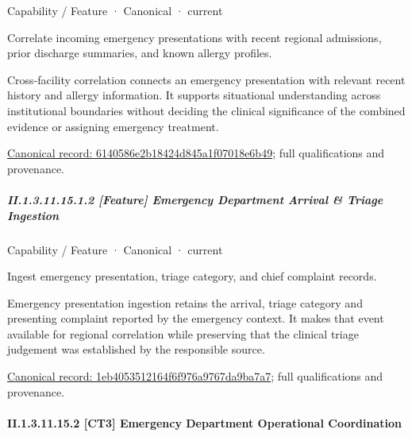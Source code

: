 \label{element:6140586e2b18424d845a1f07018e6b49}
{\small Capability / Feature · Canonical · current}\par

Correlate incoming emergency presentations with recent regional admissions, prior discharge summaries, and known allergy profiles.



Cross-facility correlation connects an emergency presentation with relevant recent history and allergy information. It supports situational understanding across institutional boundaries without deciding the clinical significance of the combined evidence or assigning emergency treatment.


{\footnotesize \href{../../../../continuum/strategy/capability/feature/6140586e2b18424d845a1f07018e6b49.md}{Canonical record: 6140586e2b18424d845a1f07018e6b49}; full qualifications and provenance.}\par
\subparagraph*{II.1.3.11.15.1.2 [Feature] Emergency Department Arrival \& Triage Ingestion}
\label{navigation:II.1.3.11.15.1.2}

\label{element:1eb4053512164f6f976a9767da9ba7a7}
{\small Capability / Feature · Canonical · current}\par

Ingest emergency presentation, triage category, and chief complaint records.



Emergency presentation ingestion retains the arrival, triage category and presenting complaint reported by the emergency context. It makes that event available for regional correlation while preserving that the clinical triage judgement was established by the responsible source.


{\footnotesize \href{../../../../continuum/strategy/capability/feature/1eb4053512164f6f976a9767da9ba7a7.md}{Canonical record: 1eb4053512164f6f976a9767da9ba7a7}; full qualifications and provenance.}\par
\paragraph*{II.1.3.11.15.2 [CT3] Emergency Department Operational Coordination}
\label{navigation:II.1.3.11.15.2}


